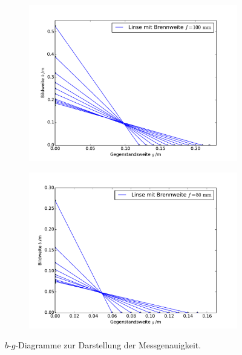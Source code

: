 \begin{figure}[hb] %
	\centering
	\begin{subfigure}{0.9\textwidth}
	\includegraphics[width=\textwidth]{Bilder/Messung1.pdf}
	\end{subfigure}
	\begin{subfigure}{0.9\textwidth}
	\includegraphics[width=\textwidth]{Bilder/Messung2.pdf}
	\end{subfigure}
	\caption{$b$-$g$-Diagramme zur Darstellung der Messgenauigkeit. \cite{matplotlib}}
	\label{fig:bgdiagramm} 
\end{figure}
